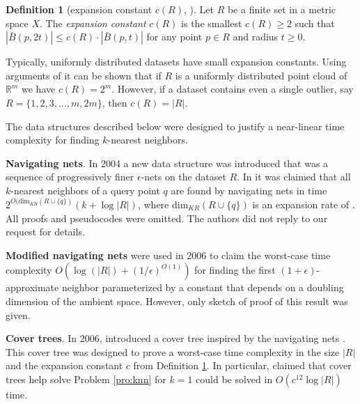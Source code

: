 \documentclass{vgtc}                          %
\numberwithin{algocf}{section}
\theoremstyle{definition}
\newtheorem{dfn}[algocf]{Definition}
\theoremstyle{definition}
\theoremstyle{definition}
\theoremstyle{plain}
\newcommand{\R}{\mathbb{R}}
\begin{document}
\begin{dfn}[expansion constant $c(R)$, {\cite[Definition~3.4]{2205.10194}}]
	\label{dfn:expansion_constant}
	Let $R$ be a finite set in a metric space $X$. 
	The \emph{expansion constant} $c(R)$ is the smallest $c(R)\geq 2$ such that $|\bar{B}(p,2t)|\leq c(R) \cdot |\bar{B}(p,t)|$ for any point $p\in R$ and radius $t\geq 0$. 
\end{dfn}

\noindent
Typically, uniformly distributed datasets have small expansion constants. Using arguments of \cite[Section~4.3]{2205.10194} it can be shown that if $R$ is a uniformly distributed point cloud of $\R^{m}$ we have $c(R) = 2^{m}$. 
However, if a dataset contains even a single outlier, say $R = \{1,2,3,\dots,m,2m\}$, then $c(R) = |R|$. 
\medskip

\noindent
The data structures described below were designed to justify a near-linear time complexity for finding $k$-nearest neighbors. 
\medskip

\noindent
\textbf{Navigating nets}. In 2004 a new data structure was introduced that was a sequence of
progressively finer $\epsilon$-nets on the dataset $R$. In \cite[Theorem~2.7]{krauthgamer2004navigating}
it was claimed that all $k$-nearest neighbors of a query point $q$ are found by navigating nets in time $2^{O(\text{dim}_{KR}(R \cup \{q\})}(k + \log|R|)$, where $\text{dim}_{KR}(R \cup \{q\})$ is an expansion rate of \cite[Section~1.2]{krauthgamer2004navigating}.
All proofs and pseudocodes were omitted. The authors did not reply to our request for details. 
\medskip

\noindent
\textbf{Modified navigating nets} \cite{cole2006searching} were used in 2006 to claim the worst-case time complexity $O(\log(|R|) + (1/\epsilon)^{O(1)})$ for finding the first $(1+\epsilon)$-approximate neighbor parameterized by a constant that depends on a doubling dimension of the ambient space. 
However, only sketch of proof of this result was given. 
\medskip

\noindent
\textbf{Cover trees}. 
In 2006, \cite{beygelzimer2006cover} introduced a cover tree inspired by the navigating nets \cite{krauthgamer2004navigating}. 
This cover tree was designed to prove a worst-case time complexity in the size $|R|$ and the expansion constant $c$ from Definition \ref{dfn:expansion_constant}. 
In particular, \cite[Theorem~5]{beygelzimer2006cover} claimed that cover trees help solve Problem \ref{pro:knn} for $k = 1$ could be solved in $O(c^{12}\log|R|)$ time.
\end{document}
